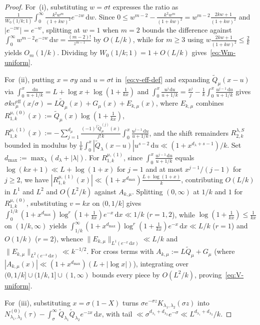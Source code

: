 \documentclass[11pt, reqno]{amsart}
\theoremstyle{remark}
\numberwithin{equation}{section}
\newcommand{\dd}{\,\mathrm{d}}
\begin{document}
\begin{proof}
For~(i), substituting $w = \sigma t$ expresses the ratio as
$\frac{1}{W_0(1/k;1)}\int_0^\infty \frac{k^2 w^m}{(1+kw)^2} e^{-zw}\dd w$.
Since $0 \le w^{m-2} - \frac{k^2 w^m}{(1+kw)^2} = w^{m-2}\frac{2kw+1}{(1+kw)^2}$ and $|e^{-zw}| = e^{-w}$,
splitting at $w=1$ when $m=2$ bounds the difference against $\int_0^\infty w^{m-2}e^{-zw}\dd w = \frac{(m-2)!}{z^{m-1}}$
by $O(L/k)$, while for $m \ge 3$ using $w\frac{2kw+1}{(1+kw)^2} \le \frac{2}{k}$ yields $O_m(1/k)$. Dividing
by $W_0(1/k;1) = 1 + O(L/k)$ gives~\eqref{eq:Wm-uniform}.

For~(ii), putting $x = \sigma y$ and $u = \sigma t$ in~\eqref{eq:v-eff-def} and expanding $\widetilde{Q}_\mu(x-u)$
via $\int_0^x \frac{\dd u}{u+1/k} = L + \log x + \log(1 + \frac{1}{kx})$ and
$\int_0^x \frac{u^j\dd u}{u+1/k} = \frac{x^j}{j} - \frac{1}{k}\int_0^x \frac{u^{j-1}\dd u}{u+1/k}$ gives
$\sigma k v_\mu^{\mathrm{eff}}(x/\sigma) = L \widetilde{Q}_\mu(x) + G_\mu(x) + E_{k,\mu}(x)$, where
$E_{k,\mu}$ combines $R_{1,k}^{\mu,(0)}(x) := \widetilde{Q}_\mu(x)\log(1 + \frac{1}{kx})$,
$R_{1,k}^{\mu,(1)}(x) := -\sum_{j=1}^{d_\mu} \frac{(-1)^j \widetilde{Q}_\mu^{(j)}(x)}{j!\, k}\int_0^x \frac{u^{j-1}\dd u}{u+1/k}$,
and the shift remainders $R_{2,k}^{\lambda,S}$ bounded in modulus by $\frac{1}{k}\int_0^x |\widetilde{Q}_\lambda(x-u)|u^{s-2}\dd u \ll (1+x^{d_\lambda+s-1})/k$.
Set $d_{\max} := \max_\lambda (d_\lambda + |\lambda|)$. For $R_{1,k}^{\mu,(1)}$, since
$\int_0^x \frac{u^{j-1}\dd u}{u+1/k}$ equals $\log(kx+1) \ll L + \log(1+x)$ for $j=1$ and at most
$x^{j-1}/(j-1)$ for $j \ge 2$, we have $|R_{1,k}^{\mu,(1)}(x)| \ll (1+x^{d_{\max}})\frac{L+\log(1+x)}{k}$,
contributing $O(L/k)$ in $L^1$ and $L^2$ and $O(L^2/k)$ against $A_{k,\mu}$. Splitting $(0,\infty)$
at $1/k$ and $1$ for $R_{1,k}^{\mu,(0)}$, substituting $v = kx$ on $(0, 1/k]$ gives
$\int_0^{1/k} (1+x^{d_{\max}})\log^r(1+\frac{1}{kx})e^{-x}\dd x \ll 1/k$ ($r = 1,2$),
while $\log(1+\frac{1}{kx}) \le \frac{1}{kx}$ on $(1/k,\infty)$ yields
$\int_{1/k}^\infty (1+x^{d_{\max}})\log^r(1+\frac{1}{kx})e^{-x}\dd x \ll L/k$ ($r = 1$) and $O(1/k)$ ($r = 2$),
whence $\|E_{k,\mu}\|_{L^1(e^{-x}\dd x)} \ll L/k$ and $\|E_{k,\mu}\|_{L^2(e^{-x}\dd x)} \ll k^{-1/2}$.
For cross terms with $A_{k,\mu} := L\widetilde{Q}_\mu + G_\mu$ (where $|A_{k,\mu}(x)| \ll (1+x^{d_{\max}})(L + |\log x|)$),
integrating over $(0, 1/k] \cup (1/k, 1] \cup (1,\infty)$ bounds every piece by $O(L^2/k)$, proving~\eqref{eq:V-uniform}.

For~(iii), substituting $x = \sigma(1-X)$ turns $\sigma e^{-\sigma z} K_{\lambda_1,\lambda_2}(\sigma z)$ into
$N_{\lambda_1,\lambda_2}^{(0)}(\tau) - \int_\sigma^\infty \widetilde{Q}_{\lambda_1}\widetilde{Q}_{\lambda_2} e^{-zx}\dd x$,
with tail $\ll \sigma^{d_{\lambda_1}+d_{\lambda_2}} e^{-\sigma} \ll L^{d_{\lambda_1}+d_{\lambda_2}}/k$.
\end{proof}
\end{document}
